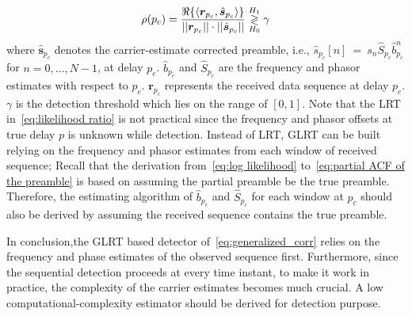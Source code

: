 \begin{equation}
    \label{eq:generalized_corr}
    \rho(p_c)=
    \frac{\Re\{\langle
      \bm{r}_{p_c},\hat{\bm{s}}_{p_c}\rangle\}}
    {||\bm{r}_{p_c}||\cdot||\hat{\bm{s}}_{p_c}||} \mathrel{\mathop\gtrless\limits^{H_1}_{H_0}} \gamma
  \end{equation}
where $\hat{\bm{s}}_{p_c}$ denotes the carrier-estimate corrected preamble, i.e., $\hat{s}_{p_c}[n]~{=}~s_{n}\hat{S}_{p_c}\hat{b}_{p_c}^n$ for $n=0,\ldots,N{-}1$,
at delay $p_c$. $\hat{b}_{p_c}$ and $\hat{S}_{p_c}$ are the frequency and phasor estimates with respect to $p_c$.
$\bm{r}_{p_c}$ represents the received data sequence at delay $p_c$.
$\gamma$ is the detection threshold which lies on the range of $[0,1]$.
Note that the LRT in~\eqref{eq:likelihood ratio} is not practical since the frequency and phasor offsets at true delay $p$
is unknown while detection. Instead of LRT, GLRT can be built relying on the frequency and phasor estimates from each window of received sequence;
Recall that the derivation from~\eqref{eq:log likelihood} to~\eqref{eq:partial ACF of the preamble} is based on assuming the partial preamble be the true preamble.
Therefore, the estimating algorithm of $\hat{b}_{p_c}$ and $\hat{S}_{p_c}$ for each window at $p_c$ should also be derived by
assuming the received sequence contains the true preamble.

In conclusion,the GLRT based detector of~\eqref{eq:generalized_corr} relies on the frequency and phase estimates of the observed sequence first.
Furthermore, since the sequential detection proceeds at every time instant, to make it work in practice, the complexity of the carrier estimates becomes
much crucial. A low computational-complexity estimator should be derived for detection purpose.

%
% 
